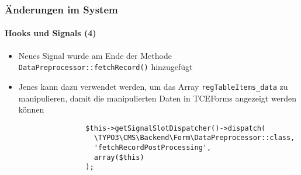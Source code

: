 
\begin{frame}[fragile]
	\frametitle{Änderungen im System}
	\framesubtitle{Hooks und Signals (4)}

	\begin{itemize}

		\item Neues Signal wurde am Ende der Methode \texttt{DataPreprocessor::fetchRecord()} hinzugefügt
		\item Jenes kann dazu verwendet werden, um das Array \texttt{regTableItems\_data}
			zu manipulieren, damit die manipulierten Daten in TCEForms angezeigt
			werden können

			\begin{lstlisting}
				$this->getSignalSlotDispatcher()->dispatch(
				  \TYPO3\CMS\Backend\Form\DataPreprocessor::class,
				  'fetchRecordPostProcessing',
				  array($this)
				);
			\end{lstlisting}

	\end{itemize}

\end{frame}


